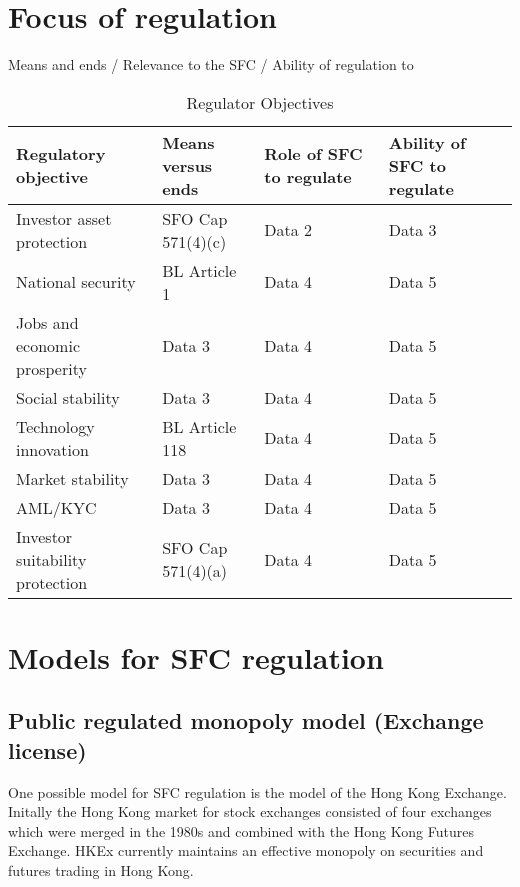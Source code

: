 \section{Focus of regulation}

Means and ends / Relevance to the SFC / Ability of regulation to 
\begin{landscape}
\thispagestyle{empty} %

\begin{table}[htbp]
  \centering
  \caption{Regulator Objectives}
  \begin{tabularx}{\linewidth}{|X|X|X|X|}
    \hline
    \textbf{Regulatory objective} & \textbf{Means versus ends} & \textbf{Role of SFC to regulate} & \textbf{Ability of SFC to regulate} \\
    \hline
    Investor asset protection & SFO Cap 571(4)(c) & Data 2 & Data 3 \\
    \hline
    National security & BL Article 1 & Data 4  & Data 5\\
    \hline
    Jobs and economic prosperity & Data 3 & Data 4  & Data 5\\
    \hline
    Social stability & Data 3 & Data 4  & Data 5\\
    \hline
    Technology innovation & BL Article 118 & Data 4  & Data 5\\
    \hline
    Market stability & Data 3 & Data 4  & Data 5\\
    \hline
    AML/KYC & Data 3 & Data 4  & Data 5\\
    \hline
    Investor suitability protection & SFO Cap 571(4)(a) & Data 4  & Data 5\\
  \end{tabularx}
\end{table}

\end{landscape}

\section{Models for SFC regulation}

\subsection{Public regulated monopoly model (Exchange license)}
One possible model for SFC regulation is the model of the Hong Kong
Exchange.  Initally the Hong Kong market for stock exchanges consisted
of four exchanges which were merged in the 1980s and combined with the
Hong Kong Futures Exchange.  HKEx currently maintains an effective
monopoly on securities and futures trading in Hong Kong.

